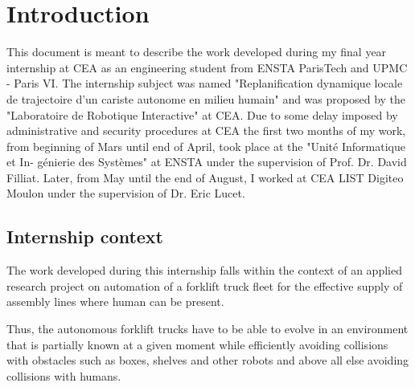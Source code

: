
\let\savecleardoublepage\cleardoublepage
\let\cleardoublepage\clearpage
\chapter{Introduction}

This document is meant to describe the work developed during my final year internship at CEA
as an engineering student from ENSTA ParisTech and UPMC - Paris VI.
The internship subject was named "Replanification dynamique locale de trajectoire d’un cariste autonome en milieu humain" and was proposed by the "Laboratoire de Robotique Interactive" at CEA.
Due to some delay imposed by administrative and security procedures at CEA 
the first two months of my work,
from beginning of Mars until end of April, took place at the "Unité Informatique et In-
génierie des Systèmes" at ENSTA under the supervision of Prof. Dr. David Filliat.
Later, from May until the end of August, I worked at CEA LIST Digiteo Moulon under the
supervision of Dr. Eric Lucet.


\section{Internship context}


The work developed during this internship falls within the context of an applied research project on 
automation of a forklift truck fleet for the effective supply of assembly lines where human can be 
present.

Thus, the autonomous forklift trucks
have to be able to evolve in an environment that is partially known at a given moment while efficiently 
avoiding collisions with obstacles such as boxes, shelves and other robots and above all else avoiding 
collisions with humans.



